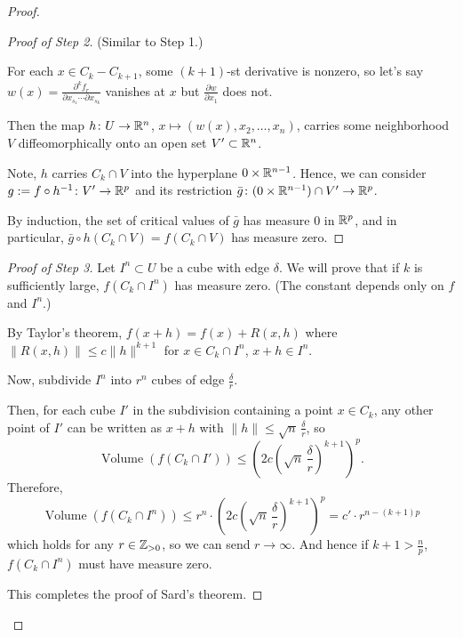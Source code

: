 \begin{proof}
    \begin{proof}[Proof of Step 2]
        (Similar to Step 1.)

        For each $x \in C_k - C_{k+1}$, some $(k+1)$-st derivative is nonzero, so let's say $w(x) = \frac{\partial^k f_r}{\partial x_{s_1} \cdots \partial x_{s_k}}$ vanishes at $x$ but $\frac{\partial w}{\partial x_1}$ does not.

        Then the map $h \colon U \to \mathbb{R}^n$, $x \mapsto (w(x), x_2, \ldots, x_n)$, carries some neighborhood $V$ diffeomorphically onto an open set $V' \subset \mathbb{R}^n$.

        Note, $h$ carries $C_k \cap V$ into the hyperplane $0 \times \mathbb{R}^{n-1}$. Hence, we can consider $g := f \circ h^{-1} \colon V' \to \mathbb{R}^p$ and its restriction $\bar{g} \colon (0 \times \mathbb{R}^{n-1}) \cap V' \to \mathbb{R}^p$.

        By induction, the set of critical values of $\bar{g}$ has measure $0$ in $\mathbb{R}^p$, and in particular, $\bar{g} \circ h(C_k \cap V) = f(C_k \cap V)$ has measure zero.
    \end{proof}

    \begin{proof}[Proof of Step 3]
        Let $I^n \subset U$ be a cube with edge $\delta$. We will prove that if $k$ is sufficiently large, $f(C_k \cap I^n)$ has measure zero. (The constant depends only on $f$ and $I^n$.)

        By Taylor's theorem, $f(x + h) = f(x) + R(x,h)$ where $\|R(x,h)\| \leq c\|h\|^{k+1}$ for $x \in C_k \cap I^n$, $x + h \in I^n$.

        Now, subdivide $I^n$ into $r^n$ cubes of edge $\frac{\delta}{r}$.

        Then, for each cube $I'$ in the subdivision containing a point $x \in C_k$, any other point of $I'$ can be written as $x + h$ with $\|h\| \leq \sqrt{n}\,\frac{\delta}{r}$, so
        \[
            \operatorname{Volume}(f(C_k \cap I')) \leq \left(2c\left(\sqrt{n}\,\frac{\delta}{r}\right)^{k+1}\right)^p.
        \]
        Therefore,
        \[
            \operatorname{Volume}(f(C_k \cap I^n)) \leq r^n \cdot \left(2c\left(\sqrt{n}\,\frac{\delta}{r}\right)^{k+1}\right)^p = c' \cdot r^{n - (k+1)p}
        \]
        which holds for any $r \in \mathbb{Z}_{>0}$, so we can send $r \to \infty$. And hence if $k + 1 > \frac{n}{p}$, $f(C_k \cap I^n)$ must have measure zero.

        This completes the proof of Sard's theorem.
    \end{proof}
\end{proof}
